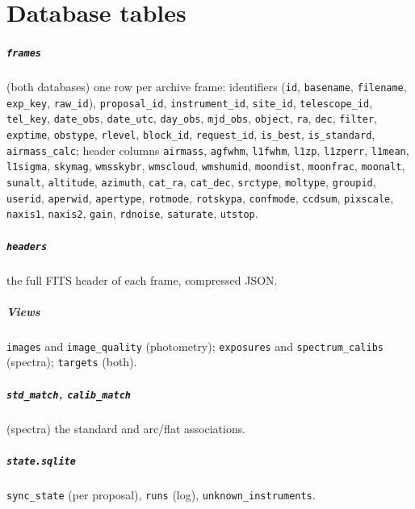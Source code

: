 \chapter{Database tables}\label{sec:schema}
\paragraph{\texttt{frames}} (both databases) one row per archive frame: identifiers (\texttt{id}, \texttt{basename},
\texttt{filename}, \texttt{exp\_key}, \texttt{raw\_id}), \texttt{proposal\_id}, \texttt{instrument\_id},
\texttt{site\_id}, \texttt{telescope\_id}, \texttt{tel\_key}, \texttt{date\_obs}, \texttt{date\_utc}, \texttt{day\_obs},
\texttt{mjd\_obs}, \texttt{object}, \texttt{ra}, \texttt{dec}, \texttt{filter}, \texttt{exptime}, \texttt{obstype},
\texttt{rlevel}, \texttt{block\_id}, \texttt{request\_id}, \texttt{is\_best}, \texttt{is\_standard},
\texttt{airmass\_calc}; header columns \texttt{airmass}, \texttt{agfwhm}, \texttt{l1fwhm}, \texttt{l1zp},
\texttt{l1zperr}, \texttt{l1mean}, \texttt{l1sigma}, \texttt{skymag}, \texttt{wmsskybr}, \texttt{wmscloud},
\texttt{wmshumid}, \texttt{moondist}, \texttt{moonfrac}, \texttt{moonalt}, \texttt{sunalt}, \texttt{altitude},
\texttt{azimuth}, \texttt{cat\_ra}, \texttt{cat\_dec}, \texttt{srctype}, \texttt{moltype}, \texttt{groupid},
\texttt{userid}, \texttt{aperwid}, \texttt{apertype}, \texttt{rotmode}, \texttt{rotskypa}, \texttt{confmode},
\texttt{ccdsum}, \texttt{pixscale}, \texttt{naxis1}, \texttt{naxis2}, \texttt{gain}, \texttt{rdnoise},
\texttt{saturate}, \texttt{utstop}.
\paragraph{\texttt{headers}} the full FITS header of each frame, compressed JSON.
\paragraph{Views} \texttt{images} and \texttt{image\_quality} (photometry); \texttt{exposures} and
\texttt{spectrum\_calibs} (spectra); \texttt{targets} (both).
\paragraph{\texttt{std\_match}, \texttt{calib\_match}} (spectra) the standard and arc/flat associations.
\paragraph{\texttt{state.sqlite}} \texttt{sync\_state} (per proposal), \texttt{runs} (log),
\texttt{unknown\_instruments}.
